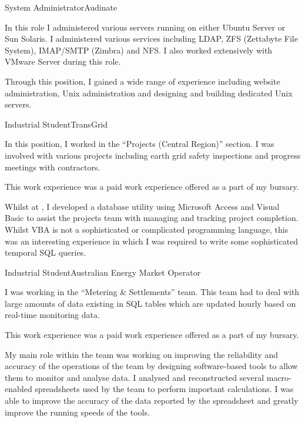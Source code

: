 \documentclass[10pt]{article}
\begin{document}
\begin{professionalExperience}
{System Administrator}{Audinate}
{In this role I administered various servers running on either Ubuntu Server or 
Sun Solaris. I administered various services including LDAP, ZFS (Zettabyte File
System), IMAP/SMTP (Zimbra) and NFS. I also worked extensively with VMware 
Server during this role.

Through this position, I gained a wide range of experience including website
administration, Unix administration and designing and building dedicated Unix
servers.}
{
}

{Industrial Student}{TransGrid}
{In this position, I worked in the ``Projects (Central Region)'' section. I was 
involved with various projects including earth grid safety inspections and 
progress meetings with contractors.

This work experience was a paid work experience offered as a part of my 
 bursary.

Whilst at , I developed a database utility using 
Microsoft Access and Visual Basic to assist the projects team with managing and 
tracking project completion. Whilst VBA is not a sophisticated or complicated
programming language, this was an interesting experience in which I was required
to write some sophisticated temporal SQL queries.}
{
}

{Industrial Student}{Australian Energy Market Operator}
{I was working in the ``Metering \& Settlements'' team. This team had to deal 
with large amounts of data existing in SQL tables which are updated hourly based 
on real-time monitoring data.

This work experience was a paid work experience offered as a part of my 
 bursary.

My main role within the team was working on improving the reliability and 
accuracy of the operations of the team by designing software-based tools to 
allow them to monitor and analyse data. I analysed and reconstructed several 
macro-enabled spreadsheets used by the team to perform important calculations. I
was able to improve the accuracy of the data reported by the spreadsheet and 
greatly improve the running speeds of the tools.}
{
}


\end{professionalExperience}
\end{document}
